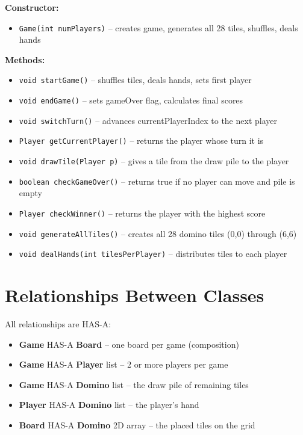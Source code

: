 \documentclass[11pt,a4paper]{article}
\begin{document}
\textbf{Constructor:}
\begin{itemize}[nosep]
  \item \texttt{Game(int numPlayers)} -- creates game, generates all 28 tiles, shuffles, deals hands
\end{itemize}

\textbf{Methods:}
\begin{itemize}[nosep]
  \item \texttt{void startGame()} -- shuffles tiles, deals hands, sets first player
  \item \texttt{void endGame()} -- sets gameOver flag, calculates final scores
  \item \texttt{void switchTurn()} -- advances currentPlayerIndex to the next player
  \item \texttt{Player getCurrentPlayer()} -- returns the player whose turn it is
  \item \texttt{void drawTile(Player p)} -- gives a tile from the draw pile to the player
  \item \texttt{boolean checkGameOver()} -- returns true if no player can move and pile is empty
  \item \texttt{Player checkWinner()} -- returns the player with the highest score
  \item \texttt{void generateAllTiles()} -- creates all 28 domino tiles (0,0) through (6,6)
  \item \texttt{void dealHands(int tilesPerPlayer)} -- distributes tiles to each player
\end{itemize}

\section{Relationships Between Classes}

All relationships are HAS-A:

\begin{itemize}[nosep]
  \item \textbf{Game} HAS-A \textbf{Board} -- one board per game (composition)
  \item \textbf{Game} HAS-A \textbf{Player} list -- 2 or more players per game
  \item \textbf{Game} HAS-A \textbf{Domino} list -- the draw pile of remaining tiles
  \item \textbf{Player} HAS-A \textbf{Domino} list -- the player's hand
  \item \textbf{Board} HAS-A \textbf{Domino} 2D array -- the placed tiles on the grid
\end{itemize}
\end{document}
